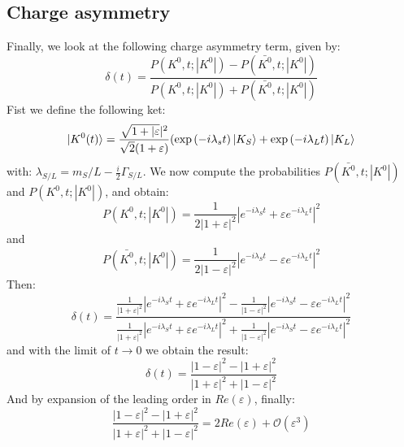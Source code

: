\documentclass[a4paper]{article}
\begin{document}
\subsection{Charge asymmetry}
Finally, we look at the following charge asymmetry term, given by:
\begin{equation}
    \delta(t)=\frac{P(K^0,t;|K^0|)-P(\bar{K^0},t;|K^0|)}{P(K^0,t;|K^0|)+P(\bar{K^0},t;|K^0|)}
\end{equation}
Fist we define the following ket:
\begin{equation}
    \ket{K^0(t)}=\frac{\sqrt{1+|\varepsilon}|^2}{\sqrt{2}(1+\varepsilon)}(\exp{(-i\lambda_st)}\ket{K_S}+\exp{(-i\lambda_Lt)}\ket{K_L}
\end{equation}
with: $\lambda_{S/L}=m{_S/L}-\frac{i}{2}\Gamma_{S/L}$. We now compute the probabilities $P(\bar{K^0},t;|K^0|)$ and $P(K^0,t;|K^0|)$, and obtain:
\begin{equation}
    P(K^0,t;|K^0|)=\frac{1}{2|1+\varepsilon|^2}|e^{-i\lambda_S t}+
    \varepsilon e^{-i\lambda_L t}|^2
\end{equation}
and
\begin{equation}
    P(\bar{K^0},t;|K^0|)=\frac{1}{2|1-\varepsilon|^2}|
    e^{-i\lambda_S t}-\varepsilon e^{-i\lambda_L t}|^2
\end{equation}
Then:
\begin{equation}
    \delta(t)=\frac{\frac{1}{|1+\varepsilon|^2}|
    e^{-i\lambda_S t}+\varepsilon
    e^{-i\lambda_L t}|^2-\frac{1}{|1-\varepsilon|^2}|
    e^{-i\lambda_S t}-\varepsilon
    e^{-i\lambda_L t}|^2}{\frac{1}{|1+\varepsilon|^2}|
    e^{-i\lambda_S t}+\varepsilon
    e^{-i\lambda_L t}|^2+\frac{1}{|1-\varepsilon|^2}|
    e^{-i\lambda_S t}-\varepsilon
    e^{-i\lambda_L t}|^2}
\end{equation}
and with the limit of $t\rightarrow 0$ we obtain the result:
\begin{equation}
    \delta(t)=\frac{|1-\varepsilon|^2-|1+\varepsilon|^2}{|1+\varepsilon|^2+|1-\varepsilon|^2}
\end{equation}
And by expansion of the leading order in $Re(\varepsilon)$, finally:
\begin{equation}
    \frac{|1-\varepsilon|^2-|1+\varepsilon|^2}{|1+\varepsilon|^2+|1-\varepsilon|^2}=2Re(\varepsilon)+\mathcal{O}(\varepsilon^3)
\end{equation}
\end{document}
